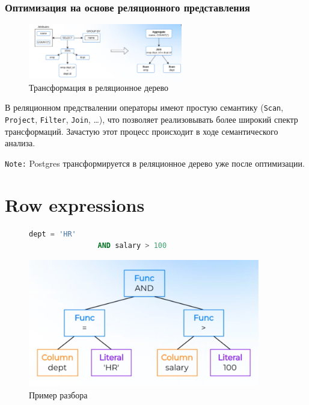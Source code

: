\documentclass[11pt]{article}
\begin{document}
    \newpage

    \subsubsection*{Оптимизация на основе реляционного представления}

    \begin{figure}[h!]
        \centering
        \vspace{1cm}
        \includegraphics[width=0.6\textwidth]{Pictures/Relational tree}
        \caption{Трансформация в реляционное дерево}
    \end{figure}

    В реляционном предствалении операторы имеют простую семантику (\texttt{Scan}, \texttt{Project}, \texttt{Filter}, \texttt{Join}, \ldots),
    что позволяет реализовывать более широкий спектр трансформаций.
    Зачастую этот процесс происходит в ходе семантического анализа.

    \texttt{Note:} Postgres трансформируется в реляционное дерево уже после оптимизации.

    \newpage


    \section{Row expressions}

    \begin{figure}[h!]
        \begin{minipage}{0.4\textwidth}
            \begin{lstlisting}[language=SQL,
                caption={Пример кода}]
                dept = 'HR'
                AND salary > 100
            \end{lstlisting}
        \end{minipage}
        \begin{minipage}{0.6\textwidth}
            \centering
            \includegraphics[width=0.9\textwidth]{Pictures/Row expressions}
            \caption{Пример разбора}
        \end{minipage}
    \end{figure}
\end{document}
